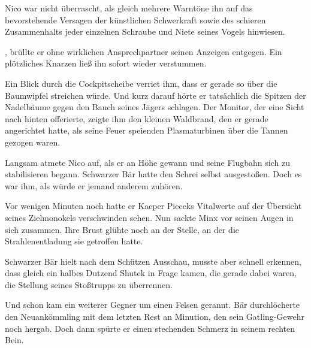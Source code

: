 \par

Nico war nicht überrascht, als gleich mehrere Warntöne ihn auf das bevorstehende Versagen der künstlichen Schwerkraft sowie des schieren Zusammenhalts jeder einzelnen Schraube und Niete seines Vogels hinwiesen.

\par

, brüllte er ohne wirklichen Ansprechpartner seinen Anzeigen entgegen.  Ein plötzliches Knarzen ließ ihn sofort wieder verstummen. 

\par

Ein Blick durch die Cockpitscheibe verriet ihm, dass er gerade so über die Baumwipfel streichen würde. Und kurz darauf hörte er tatsächlich die Spitzen der Nadelbäume gegen den Bauch seines Jägers schlagen. Der Monitor, der eine Sicht nach hinten offerierte, zeigte ihm den kleinen Waldbrand, den er gerade angerichtet hatte, als seine Feuer speienden Plasmaturbinen über die Tannen gezogen waren.

\par

Langsam atmete Nico auf, als er an Höhe gewann und seine Flugbahn sich zu stabilisieren begann.
\ortswechsel
{} Schwarzer Bär hatte den Schrei selbst ausgestoßen. Doch es war ihm, als würde er jemand anderem zuhören.

\par

Vor wenigen Minuten noch hatte er Kacper Pieceks Vitalwerte auf der Übersicht seines Zielmonokels verschwinden sehen. Nun sackte Minx vor seinen Augen in sich zusammen. Ihre Brust glühte noch an der Stelle, an der die Strahlenentladung sie getroffen hatte.

\par

Schwarzer Bär hielt nach dem Schützen Ausschau, musste aber schnell erkennen, dass gleich ein halbes Dutzend Shutek in Frage kamen, die gerade dabei waren, die Stellung seines Stoßtrupps zu überrennen.

\par

Und schon kam ein weiterer Gegner um einen Felsen gerannt. Bär durchlöcherte den Neuankömmling mit dem letzten Rest an Minution, den sein Gatling-Gewehr noch hergab. Doch dann spürte er einen stechenden Schmerz in seinem rechten Bein.

